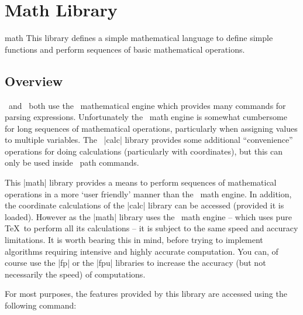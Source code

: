 %
%
%


\section{Math Library}
\label{section-library-math}

\begin{tikzlibrary}{math}
    This library defines a simple mathematical language to define simple
    functions and perform sequences of basic mathematical operations.
\end{tikzlibrary}


\subsection{Overview}

\pgfname\ and \tikzname\ both use the \pgfname\ mathematical engine which
provides many commands for parsing expressions. Unfortunately the \pgfname\
math engine is somewhat cumbersome for long sequences of mathematical
operations, particularly when assigning values to multiple variables. The
\tikzname\ |calc| library provides some additional ``convenience'' operations
for doing calculations (particularly with coordinates), but this can only be
used inside \tikzname\ path commands.

This |math| library provides a means to perform sequences of mathematical
operations in a more `user friendly' manner than the \pgfname\ math engine. In
addition, the coordinate calculations of the |calc| library can be accessed
(provided it is loaded).
%
However as the |math| library uses the \pgfname\ math engine -- which uses pure
\TeX\ to perform all its calculations -- it is subject to the same speed and
accuracy limitations. It is worth bearing this in mind, before trying to
implement algorithms requiring intensive and highly accurate computation. You
can, of course use the |fp| or the |fpu| libraries to increase the accuracy
(but not necessarily the speed) of computations.

For most purposes, the features provided by this library are accessed using the
following command:

